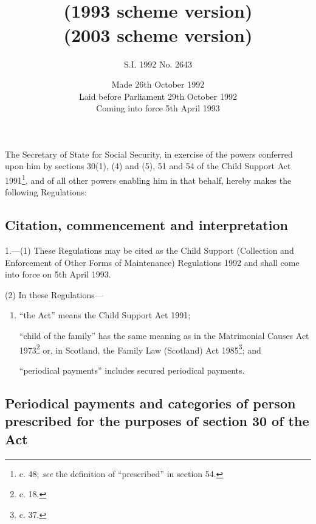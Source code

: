 \documentclass[12pt,a4paper]{article}
\title{\regstitle\\(1993 scheme version)}
\title{\regstitle\\(2003 scheme version)}
\author{S.I. 1992 No. 2643}
\date{Made 26th October 1992\\Laid before Parliament 29th October 1992\\Coming into force 5th April 1993}
\begin{document}
\maketitle

\noindent
The Secretary of State for Social Security, in exercise of the powers conferred upon him by sections 30(1), (4) and (5), 51 and 54 of the Child Support Act 1991\footnote{ c. 48; \emph{see} the definition of “prescribed” in section 54.}, and of all other powers enabling him in that behalf, hereby makes the following Regulations:

{\sloppy

\tableofcontents

}

\setcounter{secnumdepth}{-2}

\subsection[1. Citation, commencement and interpretation]{Citation, commencement and interpretation}

1.—(1) These Regulations may be cited as the Child Support (Collection and Enforcement of Other Forms of Maintenance) Regulations 1992 and shall come into force on 5th April 1993.

(2) In these Regulations—
\begin{enumerate}\item[]
“the Act” means the Child Support Act 1991;

“child of the family” has the same meaning as in the Matrimonial Causes Act 1973\footnote{ c. 18.} or, in Scotland, the Family Law (Scotland) Act 1985\footnote{ c. 37.}; and

“periodical payments” includes secured periodical payments.
\end{enumerate}

\subsection[2. Periodical payments and categories of person prescribed for the purposes of section 30 of the Act]{Periodical payments and categories of person prescribed for the purposes of section 30 of the Act}
\end{document}

